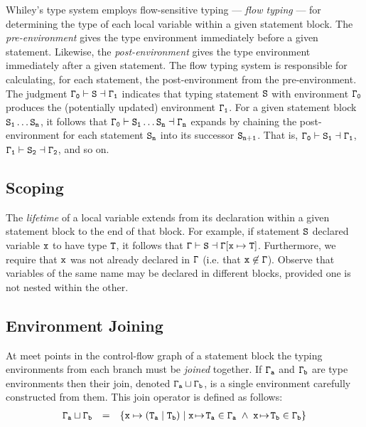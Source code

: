 Whiley's type system employs flow-sensitive typing --- {\em flow
  typing} --- for determining the type of each local variable within a
given statement block.  The {\em pre-environment} gives the type
environment immediately before a given statement.  Likewise, the {\em
  post-environment} gives the type environment immediately after a
given statement.  The flow typing system is responsible for
calculating, for each statement, the post-environment from the
pre-environment.  The judgment ${\tt\Gamma_0\vdash S\dashv \Gamma_1}$
indicates that typing statement ${\tt S}$ with environment
${\tt\Gamma_0}$ produces the (potentially updated) environment
${\tt\Gamma_1}$.  For a given statement block ${\tt S_1\ldots S_n}$, it
follows that ${\tt\Gamma_0\vdash S_1\ldots S_n\dashv \Gamma_n}$ expands by
chaining the post-environment for each statement ${\tt S_n}$ into its
successor ${\tt S_{n+1}}$.  That is,
${\tt\Gamma_0\vdash S_1\dashv \Gamma_1}$,
${\tt\Gamma_1\vdash S_2\dashv \Gamma_2}$, and so on.


\subsection{Scoping}

The {\em lifetime} of a local variable extends from its declaration
within a given statement block to the end of that block.  For example,
if statement ${\tt S}$ declared variable ${\tt x}$ to have type
${\tt T}$, it follows that
${\tt \Gamma\vdash S\dashv \Gamma[x\mapsto T]}$.  Furthermore, we require
that ${\tt x}$ was not already declared in ${\tt\Gamma}$ (i.e. that
${\tt x\not\in\Gamma}$).  Observe that variables of the same name may
be declared in different blocks, provided one is not nested within the
other.

\subsection{Environment Joining}

At meet points in the control-flow graph of a statement block the
typing environments from each branch must be {\em joined} together. If
${\tt\Gamma_a}$ and ${\tt\Gamma_b}$ are type environments then their
join, denoted ${\tt\Gamma_a\sqcup\Gamma_b}$, is a single environment
carefully constructed from them.  This join operator is defined as
follows:
\begin{displaymath}
\begin{array}{rcl}
{\tt \Gamma_a\sqcup\Gamma_b} & = & {\tt \{ x\mapsto(T_a\;|\;T_b)\;|\;x\!\mapsto\!T_a\in\Gamma_a\;\land\;x\!\mapsto\!T_b\in\Gamma_b\}}\\
\end{array}
\end{displaymath}

